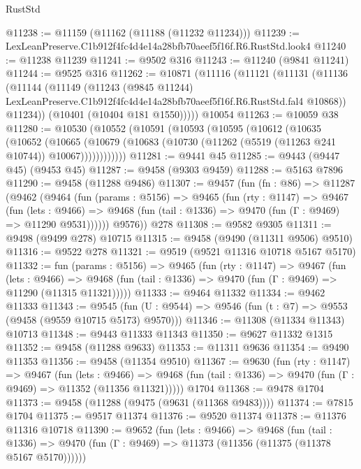 \begin{lexlean}{RustStd}
\begin{coremodule}
@11238 := @11159 (@11162 (@11188 (@11232 @11234)))
@11239 := LexLeanPreserve.C1b912f4fc4d4e14a28bfb70aeef5f16f.R6.RustStd.look4
@11240 := @11238 @11239
@11241 := @9502 @316
@11243 := @11240 (@9841 @11241)
@11244 := @9525 @316
@11262 := @10871
    (@11116
      (@11121
        (@11131
          (@11136
            (@11144
              (@11149
                (@11243
                  (@9845 @11244)
                  LexLeanPreserve.C1b912f4fc4d4e14a28bfb70aeef5f16f.R6.RustStd.fal4
                  @10868))
              @11234))
          (@10401 (@10404 @181 @1550)))))
    @10054
@11263 := @10059 @38
@11280 := @10530
    (@10552
      (@10591
        (@10593
          (@10595
            (@10612
              (@10635
                (@10652
                  (@10665
                    (@10679 (@10683 (@10730 (@11262 (@5519 (@11263 @241 @10744)) @10067))))))))))))
@11281 := @9441 @45
@11285 := @9443 (@9447 @45) (@9453 @45)
@11287 := @9458 (@9303 @9459)
@11288 := @5163 @7896
@11290 := @9458 (@11288 @9486)
@11307 := @9457
    (fun (fn : @86) =>
    @11287
      (@9462
        (@9464
          (fun (params : @5156) =>
          @9465
            (fun (rty : @1147) =>
            @9467
              (fun (lets : @9466) =>
              @9468 (fun (tail : @1336) => @9470 (fun (Γ : @9469) => @11290 @9531))))))
        @9576))
    @278
@11308 := @9582 @9305
@11311 := @9498 (@9499 @278) @10715
@11315 := @9458 (@9490 (@11311 @9506) @9510)
@11316 := @9522 @278
@11321 := @9519 (@9521 @11316 @10718 @5167 @5170)
@11332 := fun (params : @5156) =>
  @9465
    (fun (rty : @1147) =>
    @9467
      (fun (lets : @9466) =>
      @9468 (fun (tail : @1336) => @9470 (fun (Γ : @9469) => @11290 (@11315 @11321)))))
@11333 := @9464 @11332
@11334 := @9462 @11333
@11343 := @9545
    (fun (U : @9544) => @9546 (fun (t : @7) => @9553 (@9458 (@9559 @10715 @5173) @9570)))
@11346 := @11308 (@11334 @11343) @10713
@11348 := @9443 @11333 @11343
@11350 := @9627 @11332 @1315
@11352 := @9458 (@11288 @9633)
@11353 := @11311 @9636
@11354 := @9490 @11353
@11356 := @9458 (@11354 @9510)
@11367 := @9630
    (fun (rty : @1147) =>
    @9467
      (fun (lets : @9466) =>
      @9468 (fun (tail : @1336) => @9470 (fun (Γ : @9469) => @11352 (@11356 @11321)))))
    @1704
@11368 := @9478 @1704
@11373 := @9458 (@11288 (@9475 (@9631 (@11368 @9483))))
@11374 := @7815 @1704
@11375 := @9517 @11374
@11376 := @9520 @11374
@11378 := @11376 @11316 @10718
@11390 := @9652
    (fun (lets : @9466) =>
    @9468
      (fun (tail : @1336) =>
      @9470 (fun (Γ : @9469) => @11373 (@11356 (@11375 (@11378 @5167 @5170))))))

\end{coremodule}
\end{lexlean}
